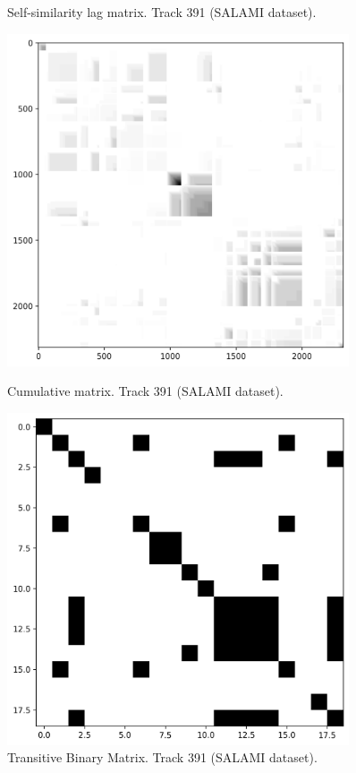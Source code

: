 \begin{figure}[ht]
\begin{minipage}{0.45\textwidth}
        \caption[Track 391 (SALAMI dataset) Self-similarity lag matrix]{Self-similarity lag matrix. Track 391 (SALAMI dataset).}
    \end{minipage}
    \vfill
    \begin{minipage}{0.45\textwidth}
        \centering
        \includegraphics[width=0.9\textwidth]{figures/images/salami_391_Q_matrix.png} %
        \caption[Track 391 (SALAMI dataset). Q-matrix]{Cumulative matrix. Track 391 (SALAMI dataset).}
    \end{minipage}\hfill
    \begin{minipage}{0.45\textwidth}
        \centering
        \includegraphics[width=0.9\textwidth]{figures/images/salami_391_binary transitive matrix.png} %
        \caption[Track 391 (SALAMI dataset). Transitive Binary Similarity Matrix]{Transitive Binary Matrix. Track 391 (SALAMI dataset).}
    \end{minipage}
\end{figure}

\newpage